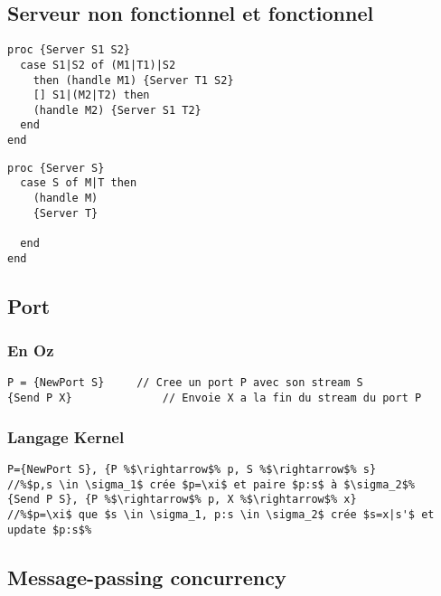 \documentclass{report}
\begin{document}
\subsection{Serveur non fonctionnel et fonctionnel}
\begin{minipage}[t]{0.45\linewidth}
\begin{lstlisting}[escapechar=\%, caption={non fonctionnel}]
proc {Server S1 S2} 
  case S1|S2 of (M1|T1)|S2 
    then (handle M1) {Server T1 S2}
    [] S1|(M2|T2) then 
    (handle M2) {Server S1 T2}
  end
end
\end{lstlisting}
\end{minipage}
%
\begin{minipage}[t]{0.45\linewidth}
\begin{lstlisting}[escapechar=\%, caption={fonctionnel}]
proc {Server S} 
  case S of M|T then 
    (handle M) 
    {Server T}
    
  end
end
\end{lstlisting}
\end{minipage}

\subsection{Port}
\subsubsection*{En Oz}
\begin{lstlisting}[escapechar=\%]
P = {NewPort S} 	// Cree un port P avec son stream S
{Send P X}	 			// Envoie X a la fin du stream du port P
\end{lstlisting}

\subsubsection*{Langage Kernel}
\begin{lstlisting}[escapechar=\%]
P={NewPort S}, {P %$\rightarrow$% p, S %$\rightarrow$% s}		//%$p,s \in \sigma_1$ crée $p=\xi$ et paire $p:s$ à $\sigma_2$%
{Send P S}, {P %$\rightarrow$% p, X %$\rightarrow$% x}			//%$p=\xi$ que $s \in \sigma_1, p:s \in \sigma_2$ crée $s=x|s'$ et update $p:s$%
\end{lstlisting}

\subsection{Message-passing concurrency}
\end{document}
